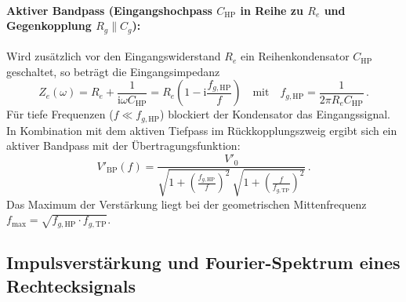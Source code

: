 \documentclass[12pt,a4paper,titlepage]{scrartcl}
\numberwithin{equation}{section}
\numberwithin{table}{section}
\numberwithin{figure}{section}
\begin{document}
\paragraph{Aktiver Bandpass (Eingangshochpass $C_{\text{HP}}$ in Reihe zu $R_e$ und Gegenkopplung $R_g \parallel C_g$):}
Wird zusätzlich vor den Eingangswiderstand $R_e$ ein Reihenkondensator $C_{\text{HP}}$ geschaltet, so beträgt die Eingangsimpedanz
\begin{equation}
    Z_e(\omega) = R_e + \frac{1}{\mathrm{i}\omega C_{\text{HP}}} = R_e \left(1 - \mathrm{i}\frac{f_{g,\text{HP}}}{f}\right) \quad \text{mit} \quad f_{g,\text{HP}} = \frac{1}{2\pi R_e C_{\text{HP}}} \,.
    \label{eq:fg_hp}
\end{equation}
Für tiefe Frequenzen ($f \ll f_{g,\text{HP}}$) blockiert der Kondensator das Eingangssignal. In Kombination mit dem aktiven Tiefpass im Rückkopplungszweig ergibt sich ein aktiver Bandpass mit der Übertragungsfunktion:
\begin{equation}
    V'_{\text{BP}}(f) = \frac{V'_0}{\sqrt{1 + \left(\frac{f_{g,\text{HP}}}{f}\right)^2}\,\sqrt{1 + \left(\frac{f}{f_{g,\text{TP}}}\right)^2}} \,.
    \label{eq:bandpass}
\end{equation}
Das Maximum der Verstärkung liegt bei der geometrischen Mittenfrequenz $f_{\text{max}} = \sqrt{f_{g,\text{HP}} \cdot f_{g,\text{TP}}}$.

\subsection{Impulsverstärkung und Fourier-Spektrum eines Rechtecksignals}
\end{document}
